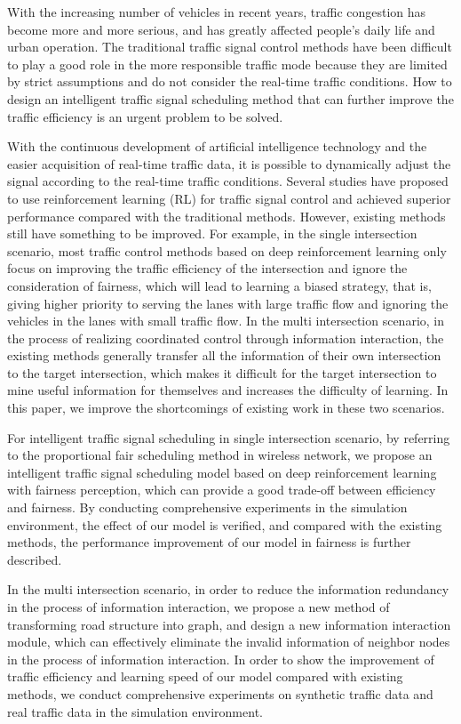 \begin{abstractEn}
With the increasing number of vehicles in recent years, traffic congestion has become more and more serious, and has greatly affected people's daily life and urban operation. The traditional traffic signal control methods have been difficult to play a good role in the more responsible traffic mode because they are limited by strict assumptions and do not consider the real-time traffic conditions. How to design an intelligent traffic signal scheduling method that can further improve the traffic efficiency is an urgent problem to be solved.

With the continuous development of artificial intelligence technology and the easier acquisition of real-time traffic data, it is possible to dynamically adjust the signal according to the real-time traffic conditions. Several studies have proposed to use reinforcement learning (RL) for traffic signal
control and achieved superior performance compared with the traditional methods. However, existing methods still have something to be improved. For example, in the single intersection scenario, most traffic control methods based on deep reinforcement learning only focus on improving the traffic efficiency of the intersection and ignore the consideration of fairness, which will lead to learning a biased strategy, that is, giving higher priority to serving the lanes with large traffic flow and ignoring the vehicles in the lanes with small traffic flow. 
In the multi intersection scenario, in the process of realizing coordinated control through information interaction, the existing methods generally transfer all the information of their own intersection to the target intersection, which makes it difficult for the target intersection to mine useful information for themselves and increases the difficulty of learning. In this paper, we improve the shortcomings of existing work in these two scenarios.

For intelligent traffic signal scheduling in single intersection scenario, by referring to the proportional fair scheduling method in wireless network, we propose an intelligent traffic signal scheduling model based on deep reinforcement learning with fairness perception, which can provide a good trade-off between efficiency and fairness. By conducting comprehensive experiments in the simulation environment, the effect of our model is verified, and compared with the existing methods, the performance improvement of our model in fairness is further described.

In the multi intersection scenario, in order to reduce the information redundancy in the process of information interaction, we propose a new method of transforming road structure into graph, and design a new information interaction module, which can effectively eliminate the invalid information of neighbor nodes in the process of information interaction. In order to show the improvement of traffic efficiency and learning speed of our model compared with existing methods, we conduct comprehensive experiments on synthetic traffic data and real traffic data in the simulation environment.

\end{abstractEn}

